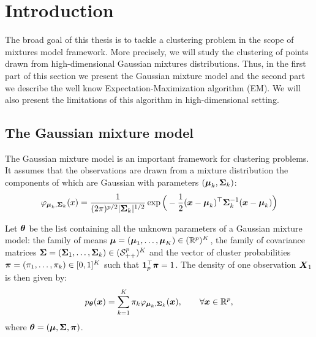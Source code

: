 
\chapter{Introduction}

The broad goal of this thesis is to tackle a clustering problem in the scope of mixtures model framework. More precisely, we will study the clustering of points drawn from high-dimensional Gaussian mixtures distributions. Thus, in the first part of this section we present the Gaussian mixture model and the second part we describe the well know  Expectation-Maximization algorithm (EM). We will also present the limitations of this algorithm in high-dimensional setting.

\section{The Gaussian mixture model}

The Gaussian mixture model is an important framework for clustering problems. It assumes that the observations are drawn from a
mixture distribution the components of which are Gaussian  with parameters $(\boldsymbol\mu_k,\boldsymbol\Sigma_k)$:
\begin{equation}
\varphi_{\boldsymbol\mu_k,\boldsymbol\Sigma_k}(x)=\frac{1}{(2\pi)^{p/2}|\boldsymbol\Sigma_k|^{1/2}} \exp\Big(-\frac{1}{2}(\boldsymbol x-\boldsymbol\mu_k)^\top\boldsymbol\Sigma_k^{-1}(\boldsymbol x-\boldsymbol\mu_k)\Big)
\end{equation}

Let ${\boldsymbol\theta}$ be the list containing all the unknown parameters of a Gaussian mixture model: the family of means $\boldsymbol\mu = (\boldsymbol\mu_1,\ldots,\boldsymbol\mu_K)
\in ({\mathbb R}^p)^K$, the family of covariance matrices $\boldsymbol\Sigma = (\boldsymbol\Sigma_1,\ldots,\boldsymbol\Sigma_k)\in(\mathcal S_{++}^p)^K$ and the vector of cluster probabilities  $\boldsymbol \pi=(\pi_1,\ldots,\pi_k)\in [0,1]^K$ such that $\b1_p^\top\bpi=1$.
The density of one observation $\boldsymbol X_1$ is then given by:
\begin{equation}\label{mixture}
p_{{\boldsymbol\theta}}(\boldsymbol x)=\sum_{k=1}^K\pi_k\varphi_{\boldsymbol\mu_k,\boldsymbol\Sigma_k}(\boldsymbol x),\qquad \forall \boldsymbol x\in{\mathbb R}^p,
\end{equation}
where ${\boldsymbol\theta}=(\boldsymbol\mu,\boldsymbol\Sigma,\boldsymbol \pi)$.


